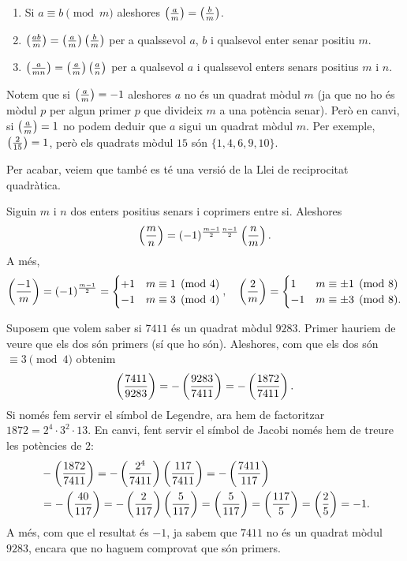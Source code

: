 \begin{lemma}
\begin{enumerate}
    \item Si $a\equiv b\pmod m$ aleshores $\left(\frac{a}{m}\right) = \left(\frac{b}{m}\right)$.
    \item $\left(\frac{ab}{m}\right)= \left(\frac{a}{m}\right) \left(\frac{b}{m}\right)$ per a qualssevol $a$, $b$ i qualsevol enter senar positiu $m$.
    \item $\left(\frac{a}{mn}\right) = \left(\frac{a}{m}\right) \left(\frac{a}{n}\right)$ per a qualsevol $a$ i qualssevol enters senars positius $m$ i $n$.
\end{enumerate}
\end{lemma}
\begin{remark}
 Notem que si $\left(\frac{a}{m}\right)=-1$ aleshores $a$ no és un quadrat mòdul $m$ (ja que no ho és mòdul $p$ per algun primer $p$ que divideix $m$ a una potència senar). Però en canvi, si $\left(\frac{a}{m}\right)=1$ no podem deduir que $a$ sigui un quadrat mòdul $m$. Per exemple, $\left(\frac{2}{15}\right) = 1$, però els quadrats mòdul $15$ són $\{1,4,6,9,10\}$.
\end{remark}

Per acabar, veiem que també es té una versió de la Llei de reciprocitat quadràtica.

 \begin{theorem}
\label{thm:lrq-jacobi}
Siguin $m$ i $n$ dos enters positius senars i coprimers entre si. Aleshores
\[
    \left(\frac{m}{n}\right) = (-1)^{\frac{m-1}{2}\frac{n-1}{2}}\left(\frac{n}{m}\right).
    \]
A més,
\[
\left(\frac{-1}{m}\right) = (-1)^{\frac{m-1}{2}}=\begin{cases}
+1&m\equiv 1\pmod{4}\\
-1&m\equiv 3\pmod{4}
\end{cases}
,\quad \left(\frac{2}{m}\right) = \begin{cases}
1 & m\equiv \pm 1\pmod {8}\\
-1 & m \equiv \pm 3 \pmod{8}.
\end{cases}
\]
\end{theorem}

\begin{example}
 Suposem que volem saber si $7411$ és un quadrat mòdul $9283$. Primer hauriem de veure que els dos són primers (sí que ho són). Aleshores, com que els dos són $\equiv 3\pmod 4$ obtenim
 \[
 \left(\frac{7411}{9283}\right) = -\left(\frac{9283}{7411}\right)=-\left(\frac{1872}{7411}\right).
 \]
 Si només fem servir el símbol de Legendre, ara hem de factoritzar $1872=2^4\cdot 3^2\cdot 13$. En canvi, fent servir el símbol de Jacobi només hem de treure les potències de $2$:
 \begin{align*}
 &-\left(\frac{1872}{7411}\right) =-\left(\frac{2^4}{7411}\right)\left(\frac{117}{7411}\right) = -\left(\frac{7411}{117}\right)\\
 &=-\left(\frac{40}{117}\right) = -\left(\frac{2}{117}\right)\left(\frac{5}{117}\right) = \left(\frac{5}{117}\right)=\left(\frac{117}{5}\right) = \left(\frac{2}{5}\right)=-1.
 \end{align*}
 A més, com que el resultat és $-1$, ja sabem que $7411$ no és un quadrat mòdul $9283$, encara que no haguem comprovat que són primers.
\end{example}
